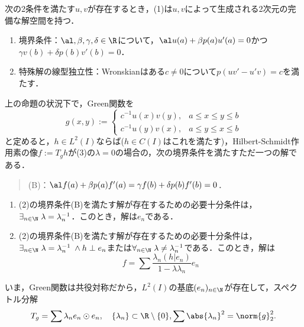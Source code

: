 \documentclass[uplatex,dvipdfmx]{jsreport}
\begin{document}
\begin{proposition}[斉次の場合]
    次の2条件を満たす$u,v$が存在するとき，(1)は$u,v$によって生成される2次元の完備な解空間を持つ．
    \begin{enumerate}
        \item 境界条件：$\al,\beta,\gamma,\delta\in\R$について，$\al u(a)+\beta p(a)u'(a)=0$かつ$\gamma v(b)+\delta p(b)v'(b)=0$．
        \item 特殊解の線型独立性：Wronskianはある$c\ne0$について$p(uv'-u'v)=c$を満たす．
    \end{enumerate}
\end{proposition}

\begin{proposition}[非斉次の場合]
    上の命題の状況下で，Green関数を
    \[g(x,y):=\begin{cases}
        c^{-1}u(x)v(y),&a\le x\le y\le b\\
        c^{-1}u(y)v(x),&a\le y\le x\le b
    \end{cases}\]
    と定めると，$h\in L^2(I)$ならば($h\in C(I)$はこれを満たす)，Hilbert-Schmidt作用素の像$f:=T_gh$が(3)の$\lambda=0$の場合の，次の境界条件を満たすただ一つの解である．
    \begin{quote}
        (B)：$\al f(a)+\beta p(a)f'(a)=\gamma f(b)+\delta p(b)f'(b)=0$．
    \end{quote}
\end{proposition}

\begin{proposition}
    \begin{enumerate}
        \item (2)の境界条件(B)を満たす解が存在するための必要十分条件は，$\exists_{n\in\N}\;\lambda=\lambda_n^{-1}$．このとき，解は$e_n$である．
        \item (2)の境界条件(B)を満たす解が存在するための必要十分条件は，$\exists_{n\in\N}\;\lambda=\lambda_n^{-1}\;\land h\perp e_n$または$\forall_{n\in\N}\;\lambda\ne\lambda_n^{-1}$である．このとき，解は
        \[f=\sum\frac{\lambda_n(h|e_n)}{1-\lambda\lambda_n}e_n\]
    \end{enumerate}
\end{proposition}
\begin{discussion}
    いま，Green関数は共役対称だから，$L^2(I)$の基底$(e_n)_{n\in\N}$が存在して，スペクトル分解
    \[T_g=\sum\lambda_ne_n\odot e_n,\quad\{\lambda_n\}\subset\R\setminus\{0\},\sum\abs{\lambda_n}^2=\norm{g}^2_2.\]
\end{discussion}
\end{document}
